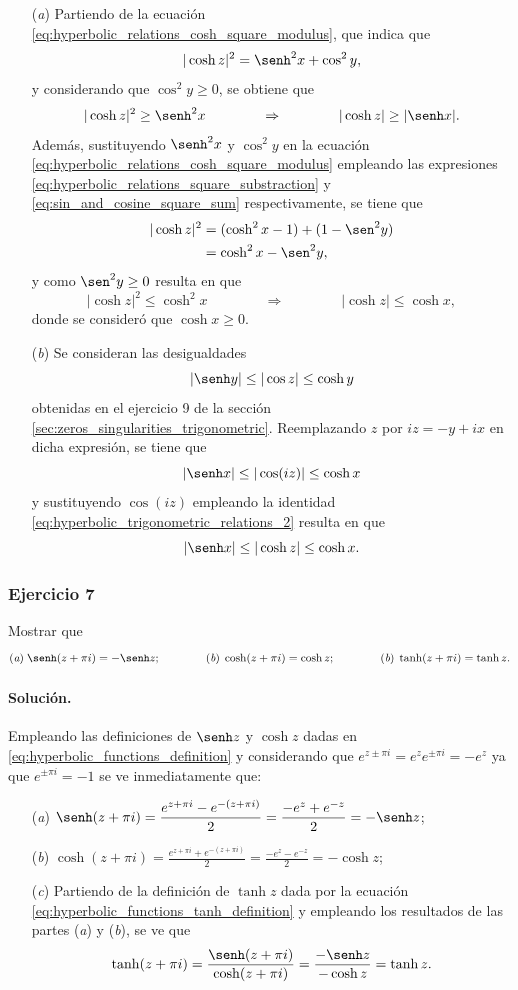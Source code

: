 \documentclass[a4paper]{report}
\begin{document}
\begin{enumerate}
 \item[(\textit{a})] Partiendo de la ecuación \ref{eq:hyperbolic_relations_cosh_square_modulus}, que indica que 
\[
 |\cosh z|^2=\senh^2x+\cos^2y,
\]
y considerando que \(\cos^2y\geq0\), se obtiene que 
\[
 |\cosh z|^2\geq\senh^2x
 \qquad\qquad\Rightarrow\qquad\qquad
 |\cosh z|\geq|\senh x|.
\]
Además, sustituyendo \(\senh^2x\) y \(\cos^2y\) en la ecuación \ref{eq:hyperbolic_relations_cosh_square_modulus} empleando las expresiones  \ref{eq:hyperbolic_relations_square_substraction} y \ref{eq:sin_and_cosine_square_sum} respectivamente, se tiene que 
\begin{align*}
 |\cosh z|^2&=(\cosh^2x-1)+(1-\sen^2y)\\ 
   &=\cosh^2x-\sen^2y,
\end{align*}
y como \(\sen^2y\geq0\) resulta en que 
\[
 |\cosh z|^2\leq\cosh^2x
 \qquad\qquad\Rightarrow\qquad\qquad
 |\cosh z|\leq\cosh x,
\]
donde se consideró que \(\cosh x\geq0\).
 \item[(\textit{b})] Se consideran las desigualdades
 \[
  |\senh y|\leq|\cos z|\leq\cosh y
 \]
 obtenidas en el ejercicio 9  de la sección \ref{sec:zeros_singularities_trigonometric}. Reemplazando \(z\) por \(iz=-y+ix\) en dicha expresión, se tiene que 
 \[
  |\senh x|\leq|\cos(iz)|\leq\cosh x
 \]
 y sustituyendo \(\cos(iz)\) empleando la identidad \ref{eq:hyperbolic_trigonometric_relations_2} resulta en que
 \[
  |\senh x|\leq|\cosh z|\leq\cosh x.
 \]
\end{enumerate}

\subsubsection{Ejercicio 7}

Mostrar que 
\[
 (\textit{a})\;\senh(z+\pi i)=-\senh z;\qquad\qquad (\textit{b})\;\cosh(z+\pi i)=\cosh z;
 \qquad\qquad (\textit{b})\;\tanh(z+\pi i)=\tanh z.
\]

\paragraph{Solución.}

Empleando las definiciones de \(\senh z\) y \(\cosh z\) dadas en \ref{eq:hyperbolic_functions_definition} y considerando que \(e^{z\pm\pi i}=e^{z}e^{\pm\pi i}=-e^{z}\) ya que \(e^{\pm\pi i}=-1\) se ve inmediatamente que:
\begin{enumerate}
 \item[(\textit{a})] \(\displaystyle\senh(z+\pi i)=\frac{e^{z+\pi i}-e^{-(z+\pi i)}}{2}=\frac{-e^z+e^{-z}}{2}=-\senh z\);
 \item[(\textit{b})] \(\displaystyle\cosh(z+\pi i)=\frac{e^{z+\pi i}+e^{-(z+\pi i)}}{2}=\frac{-e^z-e^{-z}}{2}=-\cosh z\);
 \item[(\textit{c})] Partiendo de la definición de \(\tanh z\) dada por la ecuación  \ref{eq:hyperbolic_functions_tanh_definition} y empleando los resultados de las partes (\textit{a}) y (\textit{b}), se ve que 
 \[
  \tanh(z+\pi i)=\frac{\senh(z+\pi i)}{\cosh(z+\pi i)}=\frac{-\senh z}{-\cosh z}=\tanh z.
 \]
\end{enumerate}
\end{document}
